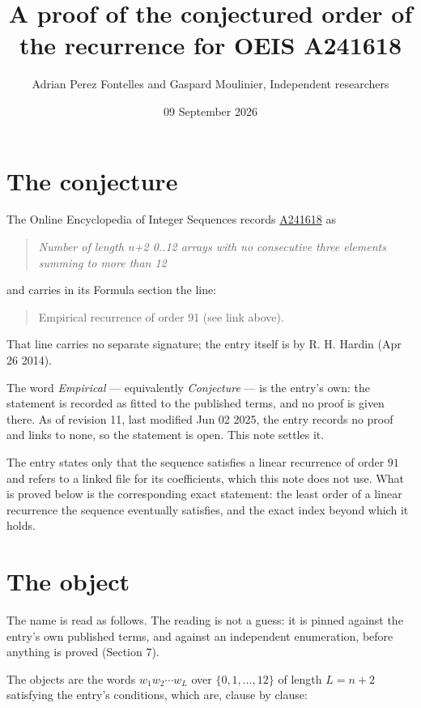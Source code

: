 \documentclass[11pt]{article}
\title{A proof of the conjectured order of the recurrence for OEIS A241618}
\author{Adrian Perez Fontelles and Gaspard Moulinier, Independent researchers}
\date{09 September 2026}
\theoremstyle{definition}
\begin{document}
\maketitle
\section{The conjecture}

The Online Encyclopedia of Integer Sequences records \href{https://oeis.org/A241618}{A241618} as

\begin{quote}\itshape Number of length n+2 0..12 arrays with no consecutive three elements summing to more than 12\end{quote}

and carries in its Formula section the line:

\begin{quote}\ttfamily Empirical recurrence of order 91 (see link above).\end{quote}

That line carries no separate signature; the entry itself is by R. H. Hardin (Apr 26 2014).

The word {\itshape Empirical} --- equivalently {\itshape Conjecture} --- is the entry's own: the statement is recorded as fitted to the published terms, and no proof is given there. As of revision 11, last modified Jun 02 2025, the entry records no proof and links to none, so the statement is open. This note settles it.

The entry states only that the sequence satisfies a linear recurrence of order $91$ and refers to a linked file for its coefficients, which this note does not use. What is proved below is the corresponding exact statement: the least order of a linear recurrence the sequence eventually satisfies, and the exact index beyond which it holds.

\section{The object}

The name is read as follows. The reading is not a guess: it is pinned against the entry's own published terms, and against an independent enumeration, before anything is proved (Section 7).

The objects are the words $w_1 w_2 \cdots w_L$ over $\{0,1,\dots,12\}$ of length $L = n + 2$ satisfying the entry's conditions, which are, clause by clause:
\end{document}
